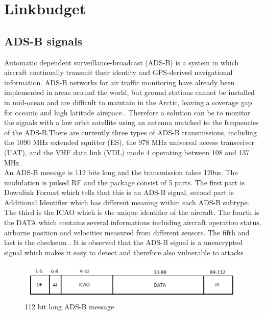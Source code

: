 \chapter{Linkbudget}\label{ch:linkbudget}

\section{ADS-B signals}
Automatic dependent surveillance-broadcast (ADS-B) is a system in which aircraft continually transmit their identity and GPS-derived navigational information. ADS-B networks for air traffic monitoring have already been implemented in areas around the world, but ground stations cannot be installed in mid-ocean and are difficult to maintain in the Arctic, leaving a coverage gap for oceanic and high latitude airspace \citep{FlyingLab}. Therefore a solution can be to monitor the signals with a low orbit satellite using an antenna matched to the frequencies of the ADS-B.There are currently three types of ADS-B transmissions, including the 1090 MHz extended squitter (ES), the 978 MHz universal access transceiver (UAT), and the VHF data link (VDL) mode 4 operating between 108 and 137 MHz.
 \\
An ADS-B message is 112 bits long and the transmission takes 120us. The mudulation is pulsed RF and the package consist of 5 parts. The first part is Downlink Format which tells that this is an ADS-B signal, second part is Additional Identifier which has different meaning within each ADS-B subtype. The third is the ICAO which is the unique identifier of the aircraft. The fourth is the DATA which contains several informations including aircraft operation status, airborne position and velocities measured from different sensors. The fifth and last is the checksum \citep{Modesorg}. It is observed that the ADS-B signal is a unencrypted signal which makes it easy to detect and therefore also vulnerable to attacks \citep{Attacks}.       

\begin{figure}[h]
\centering 
\includegraphics[scale = 0.5]{figures/adsb_signals/adsb_message.png}
\caption{112 bit long ADS-B message}
\label{fig:adsb_mes}
\end{figure}


